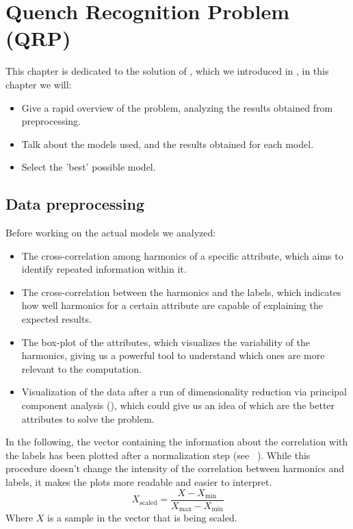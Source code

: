 \chapter{Quench Recognition Problem (QRP)}
\label{chp:qrp}
This chapter is dedicated to the solution of \qrp, which we introduced in , in this chapter we will:
\begin{itemize}
	\item Give a rapid overview of the problem, analyzing the results obtained from
	      preprocessing.
	\item Talk about the models used, and the results obtained for each model.
	\item Select the 'best' possible model.
\end{itemize}

\section{Data preprocessing}
\label{sec:qrp-preprocessing}
Before working on the actual models we analyzed:
\begin{itemize}
	\item The cross-correlation among harmonics of a specific attribute, which aims to identify repeated
	      information within it.
	\item The cross-correlation between the harmonics and the labels, which indicates how
	      well harmonics for a certain attribute are capable of explaining the expected results.
	\item The box-plot of the attributes, which visualizes the variability of the harmonics,
	      giving us a powerful tool to understand which ones are more relevant to the
	      computation.
	\item Visualization of the data after a run of dimensionality reduction via principal component
	      analysis (\pca), which could give us an idea of which are the better attributes to solve the problem.
\end{itemize}
In the following, the vector containing the information about the correlation with the labels has
been plotted after a normalization step (see ~\cite{Nishok2024}). While this
procedure doesn't change the intensity of the correlation between harmonics and labels, it
makes the plots more readable and easier to interpret.
\begin{equation}
	\label{eq:normalization}
	X_\text{scaled} = \frac{X - X_\text{min}}{X_\text{max} - X_\text{min}}
\end{equation}
Where $X$ is a sample in the vector that is being scaled.

